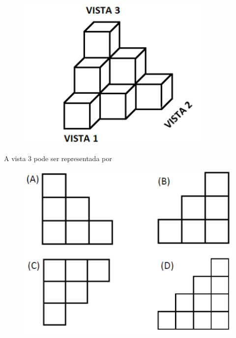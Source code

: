 \begin{figure}[H]
\centering\includegraphics[width=.8\textwidth]{./imgSAEB_6_MAT/media/image112.png}
\end{figure}

A vista $3$ pode ser representada por

\begin{figure}[H]
\includegraphics[width=\textwidth]{./imgSAEB_6_MAT/media/image113.png}
\end{figure}


